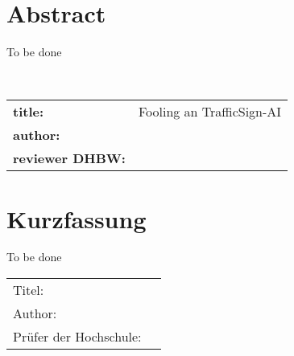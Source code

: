 \chapter*{Abstract} %
To be done

~\newline
~\newline
\begin{flushleft}
	\begin{tabular}{lp{11cm}}
		\textbf{title:} & Fooling an TrafficSign-AI \\
		\textbf{author:}  & \autor \\
		\textbf{reviewer DHBW:} & \betreuerth \\
		[6ex]%
	\end{tabular} 
\end{flushleft}


\chapter*{Kurzfassung} 
To be done
~\newline
\begin{flushleft}
	\begin{tabular}{lp{11cm}}
		Titel:&  \titel \\ 
		Author:&  \autor \\
		Prüfer der Hochschule: &  \betreuerth \\ 
		[6ex]%
	\end{tabular} 
\end{flushleft}